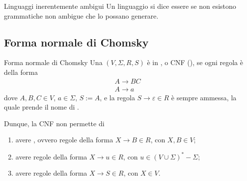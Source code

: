 \documentclass[a4paper, 12pt]{report}
\begin{document}
    \begin{frameddefn}{Linguaggi inerentemente ambigui}
        Un linguaggio si dice essere  se non esistono grammatiche non ambigue che lo possano generare.
    \end{frameddefn}

    \subsection{Forma normale di Chomsky}

    \begin{frameddefn}{Forma normale di Chomsky}
        Una \CFG $(V, \Sigma, R, S)$ è in , o CNF (), se ogni regola è della forma $$\left . \begin{array}{c} A \to BC \\ A \to a \end{array} \right .$$ dove $A, B, C \in V$, $a \in \Sigma$, $S := A$, e la regola $S \to \varepsilon \in R$ è sempre ammessa, la quale prende il nome di .

        Dunque, la CNF non permette di

        \begin{enumerate}[label=\roman*), font=\itshape]
            \item avere , ovvero regole della forma $X \to B \in R$, con $X,B \in V$;
            \item avere regole della forma $X \to u \in R$, con $u \in (V \cup \Sigma)^* - \Sigma$;
            \item avere regole della forma $X \to S \in R$, con $X \in V$.
        \end{enumerate}
    \end{frameddefn}
\end{document}
